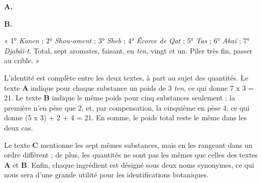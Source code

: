 \documentclass[a4paper, 11pt, oneside, landscape]{article}
\newcommand*\hieroAAAR{}
\newcommand*\hieroAADS{}
\newcommand*\hieroAADT{}
\newcommand*\hieroAADU{}
\newcommand*\hieroAAFM{}
\newcommand*\hieroAAFT{}
\newcommand*\hieroAAGK{}
\newcommand*\hieroAAGL{}
\newcommand*\hieroAAGM{}
\newcommand*\hieroAAGN{}
\newcommand*\hieroAAGO{}
\newcommand*\hieroAAGP{}
\newcommand*\hieroAAGQ{}
\newcommand*\hieroAAGR{}
\newcommand*\hieroAAGS{\raisebox{0.4ex}{}}
\newcommand*\hieroAAGT{}
\newcommand*\hieroAAGU{}
\newcommand*\hieroAAGV{\raisebox{0.7ex}{}}
\newcommand*\hieroAAGW{\raisebox{0.4ex}{}}
\newcommand*\hieroAAGX{}
\newcommand*\hieroAAGY{}
\newcommand*\hieroAAGZ{}
\begin{document}
\hspace*{10mm}\textbf{A.}\hspace*{5mm} $\hieroAAGK\:\hieroAAGL\:\hieroAAFM$ \hspace*{7.8mm} $\hieroAADU\:\hieroAADS\:\hieroAADT\:\hieroAAAR\:\hieroAAGM$ \hspace*{5.6mm} $\hieroAAGN\:\hieroAAGO\:\hieroAAGP\:\hieroAAGQ\:\hieroAAGR\:\hieroAAGS$

\hspace*{10mm}\textbf{B.}\hspace*{5mm} $\hieroAAGT\:\hieroAAGU\:\hieroAAFM$ \hspace*{8mm} $\hieroAAGV\:\hieroAADS\:\hieroAADT\:\hieroAAAR\:\hieroAAGW$ \hspace*{4.8mm} $\hieroAAGV\:\hieroAAFT\:\hieroAAGX\:\hieroAAGP\:\hieroAAGY\:\hieroAAGZ\:\hieroAAGS$

« 1° \emph{Kanen} ; 2° \emph{Shou-ament} ; 3° \emph{Sheb} ; 4° \emph{Écorce de Qat} ; 5° \emph{Tas} ; 6° \emph{Akaï} ; 7° \emph{Djabâï-t}. Total, sept aromates, faisant, en \emph{ten}, vingt et un. Piler très fin, passer au crible. »

L'identité est complète entre les deux textes, à part au sujet des quantités. Le texte \textbf{A} indique pour chaque substance un poids de 3 \emph{ten}, ce qui donne 7 x 3 = 21. Le texte \textbf{B} indique le même poids pour cinq substances seulement ; la première n'en pèse que 2, et, par compensation, la cinquième en pèse 4, ce qui donne (5 x 3) + 2 + 4 = 21. En somme, le poids total reste le même dans les deux cas.

Le texte \textbf{C} mentionne les sept mêmes substances, mais en les rangeant dans un ordre différent ; de plus, les quantités ne sont pas les mêmes que celles des textes \textbf{A} et \textbf{B}. Enfin, chaque ingrédient est désigné sous deux noms synonymes, ce qui nous sera d'une grande utilité pour les identifications botaniques.
\end{document}
